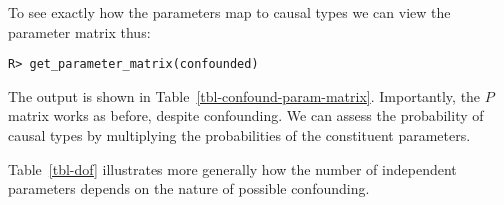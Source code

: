 \documentclass[
  11pt,
  article]{jss}
\begin{document}
To see exactly how the parameters map to causal types we can view the
parameter matrix thus:

\begin{verbatim}
R> get_parameter_matrix(confounded)
\end{verbatim}

\hypertarget{tbl-confound-param-matrix}{}
\begin{table}
\caption{\label{tbl-confound-param-matrix}Parameter Matrix for Model with Confounding. }\tabularnewline

\centering
{}
\end{table}

The output is shown in Table~\ref{tbl-confound-param-matrix}.
Importantly, the \(P\) matrix works as before, despite confounding. We
can assess the probability of causal types by multiplying the
probabilities of the constituent parameters.

Table~\ref{tbl-dof} illustrates more generally how the number of
independent parameters depends on the nature of possible confounding.
\end{document}
